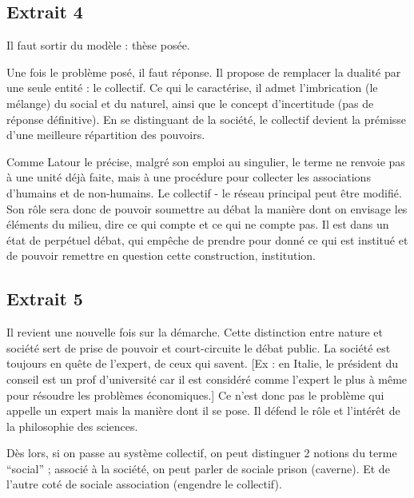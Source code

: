 \documentclass[11pt,a4paper]{article} %
\begin{document}
\subsection{Extrait 4}

Il faut sortir du modèle : thèse posée.

Une fois le problème posé, il faut réponse.
Il propose de remplacer la dualité par une seule entité : le collectif.
Ce qui le caractérise, il admet l'imbrication (le mélange) du social et du naturel, ainsi que le concept d'incertitude (pas de réponse définitive).
En se distinguant de la société, le collectif devient la prémisse d'une meilleure répartition des pouvoirs.

Comme Latour le précise, malgré son emploi au singulier, le terme ne renvoie pas à une unité déjà faite, mais à une procédure pour collecter les associations d'humains et de non-humains.
Le collectif - le réseau principal peut être modifié.
Son rôle sera donc de pouvoir soumettre au débat la manière dont on envisage les éléments du milieu, dire ce qui compte et ce qui ne compte pas.
Il est dans un état de perpétuel débat, qui empêche de prendre pour donné ce qui est institué et de pouvoir remettre en question cette construction, institution.

\subsection{Extrait 5}

Il revient une nouvelle fois sur la démarche.
Cette distinction entre nature et société sert de prise de pouvoir et court-circuite le débat public.
La société est toujours en quête de l'expert, de ceux qui savent.
[Ex : en Italie, le président du conseil est un prof d'université car il est considéré comme l'expert le plus à même pour résoudre les problèmes économiques.] Ce n'est donc pas le problème qui appelle un expert mais la manière dont il se pose.
Il défend le rôle et l'intérêt de la philosophie des sciences.

Dès lors, si on passe au système collectif, on peut distinguer 2 notions du terme  ``social'' ; associé à la société, on peut parler de sociale prison (caverne).
Et de l'autre coté de sociale association (engendre le collectif).
\end{document}
